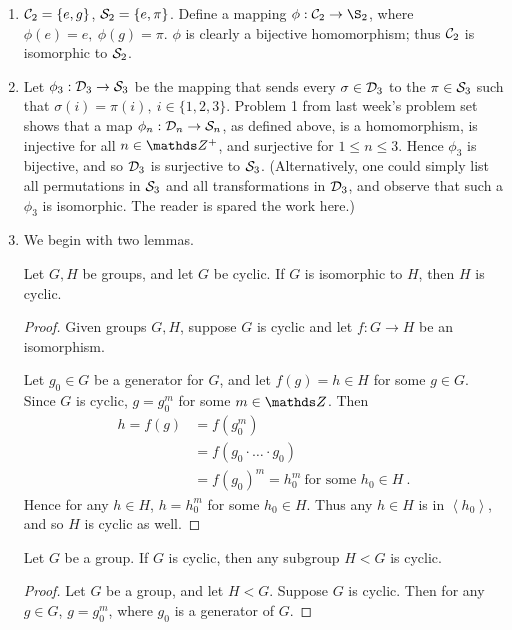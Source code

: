 \documentclass{homework}
\begin{document}
\begin{solution}
  \begin{enumerate}[label=(\alph*)]
    \item $\mathcal{C}_2=\{ e,g \}$, $ \mathcal{S}_2=\{ e,\pi \}$. Define a mapping $\phi:\mc{C}_2\to \S_2$,
      where $\phi(e)=e,\ \phi(g)=\pi$. $\phi$ is clearly a bijective homomorphism; thus $\mathcal{C}_2$ 
      is isomorphic to $ \mathcal{S}_2$.
    \item Let $\phi_3:\mathcal{D}_3\to \mathcal{S}_3$ be the mapping that sends every $\sigma\in \mathcal{D}_3$ to the
      $\pi\in \mathcal{S}_3$ such that $\sigma(i)=\pi(i),\ i\in \{ 1,2,3 \}$. Problem 1 from last week's
      problem set shows that a map $\phi_n:\mathcal{D}_n\to \mathcal{S}_n$, as defined above, is a homomorphism,
      is injective for all $n\in \Z^+$, and surjective for $1\le n\le 3$. Hence $\phi_3$ is
      bijective, and so $\mathcal{D}_3$ is surjective to $\mathcal{S}_3$. (Alternatively, one could simply list
      all permutations in $\mathcal{S}_3$ and all transformations in $\mathcal{D}_3$, and observe that such a
      $\phi_3$ is isomorphic. The reader is spared the work here.)
    \item We begin with two lemmas.
      \begin{lemma}[]
        Let $G,H$ be groups, and let $G$ be cyclic. If $G$ is isomorphic to $H$, then $H$ is cyclic.
      \end{lemma}
      \begin{proof}[Proof]
        Given groups $G,H$, suppose $G$ is cyclic and let $f:G\to H$ be an isomorphism. 

        Let $ g_0\in G$ be a generator for $G$, and let $f(g)=h\in H$ for some $g\in G$. Since $G$ 
        is cyclic, $g=g_0^{m}$ for some $m\in \Z$. Then 
        \begin{align*}
          h=f(g)&=f(g_0^{m})\\
                &= f(g_0\cdot \ldots\cdot g_0) \\
                &= f(g_0)^{m}=h_0^{m}~\text{for some $h_0\in H$}~
        .\end{align*}
        Hence for any $h\in H$, $h=h_0^{m}$ for some $ h_0\in H$. Thus any  $h\in H$ is in $\left<
        h_0\right>$, and so $H$ is cyclic as well.
      \end{proof}

      \begin{lemma}[]
        Let $G$ be a group. If $G$ is cyclic, then any subgroup $H<G$ is cyclic.
      \end{lemma}
      \begin{proof}[Proof]
        Let $G$ be a group, and let $H<G$. Suppose $G$ is cyclic. Then for any $g\in G$,
        $g=g_0^{m}$, where $ g_0$ is a generator of $G$.


\end{proof}
\end{enumerate}
\end{solution}
\end{document}
